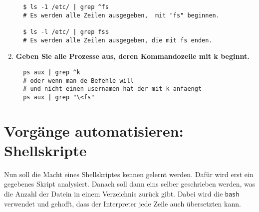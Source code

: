 \documentclass[
   draft=false
  ,paper=a4
  ,twoside=false
  ,fontsize=11pt
  ,headsepline
  ,BCOR10mm
  ,DIV11
  ,parskip=full+
]{scrartcl} %
\begin{document}
\begin{enumerate}
\begin{verbatim}
  $ ls -1 /etc/ | grep ^fs
  # Es werden alle Zeilen ausgegeben,  mit "fs" beginnen.

  $ ls -l /etc/ | grep fs$
  # Es werden alle Zeilen ausgegeben, die mit fs enden.
  \end{verbatim}

  \item \textbf{Geben Sie alle Prozesse aus, deren Kommandozeile mit k
  beginnt.}
  \begin{verbatim}
  ps aux | grep ^k
  # oder wenn man de Befehle will
  # und nicht einen usernamen hat der mit k anfaengt
  ps aux | grep "\<fs"
  \end{verbatim}
\end{enumerate}
\clearpage

\section{Vorgänge automatisieren: Shellskripte}

Nun soll die Macht eines Shellskriptes kennen gelernt werden. Dafür wird erst
ein gegebenes Skript analysiert. Danach soll dann eins selber geschrieben
werden, was die Anzahl der Datein in einem Verzeichnis zurück gibt. Dabei wird
die \texttt{bash} verwendet und gehofft, dass der Interpreter jede Zeile auch
übersetzten kann.
\end{document}
